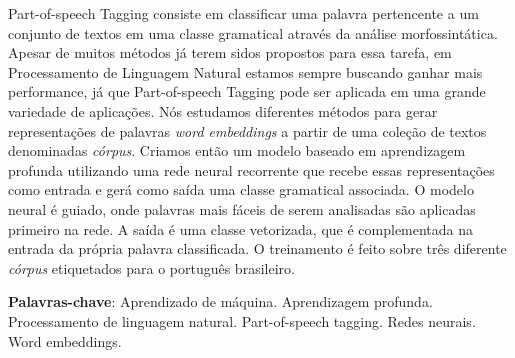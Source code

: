 \begin{resumo}
 
Part-of-speech Tagging consiste em classificar uma palavra pertencente a um conjunto de textos em uma classe gramatical através da análise morfossintática. Apesar de muitos métodos já terem sidos propostos para essa tarefa, em Processamento de Linguagem Natural estamos sempre buscando ganhar mais performance, já que Part-of-speech Tagging pode ser aplicada em uma grande variedade de aplicações. Nós estudamos diferentes métodos para gerar representações de palavras \textit{word embeddings} a partir de uma coleção de textos denominadas \textit{córpus}. Criamos então um modelo baseado em aprendizagem profunda utilizando uma rede neural recorrente que recebe essas representações como entrada e gerá como saída uma classe gramatical associada. O modelo neural é guiado, onde palavras mais fáceis de serem analisadas são aplicadas primeiro na rede. A saída é uma classe vetorizada, que é complementada na entrada da própria palavra classificada. O treinamento é feito sobre três diferente \textit{córpus} etiquetados para o português brasileiro.

 \vspace{\onelineskip}
    
 \noindent
 \textbf{Palavras-chave}: Aprendizado de máquina. Aprendizagem profunda. Processamento de linguagem natural. Part-of-speech tagging. Redes neurais. Word embeddings.
\end{resumo}
